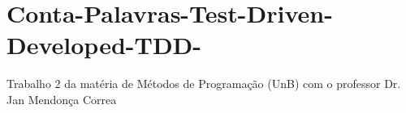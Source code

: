 \chapter{Conta-\/\+Palavras-\/\+Test-\/\+Driven-\/\+Developed-\/\+TDD-\/}
\hypertarget{md_README}{}\label{md_README}
\label{md_README_autotoc_md0}%
%
Trabalho 2 da matéria de Métodos de Programação (UnB) com o professor Dr. Jan Mendonça Correa 